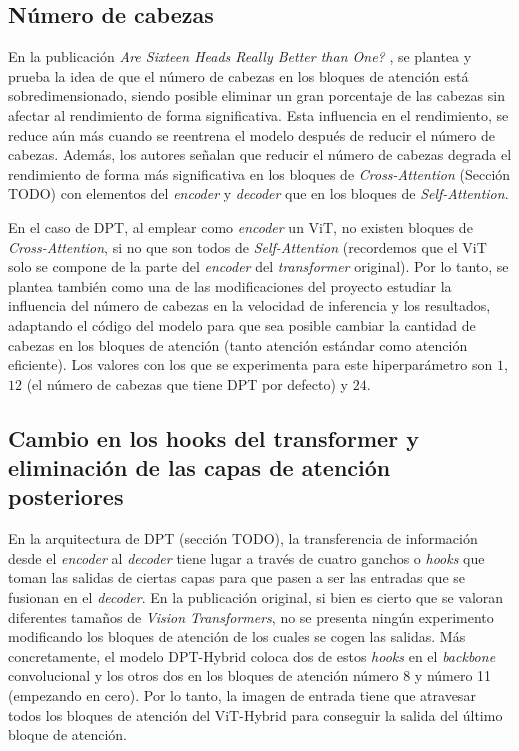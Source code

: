 \subsection{Número de cabezas}
En la publicación \textit{Are Sixteen Heads Really Better than One?} \cite{are16headsbetterthan1}, se plantea y prueba la idea de que el número de cabezas en los bloques de atención está sobredimensionado, siendo posible eliminar un gran porcentaje de las cabezas sin afectar al rendimiento de forma significativa. Esta influencia en el rendimiento, se reduce aún más cuando se reentrena el modelo después de reducir el número de cabezas.  Además, los autores señalan que reducir el número de cabezas degrada el rendimiento de forma más significativa en los bloques de \textit{Cross-Attention} (Sección TODO) con elementos del \textit{encoder} y \textit{decoder} que en los bloques de \textit{Self-Attention}. 

En el caso de DPT, al emplear como \textit{encoder} un ViT, no existen bloques de \textit{Cross-Attention}, si no que son todos de \textit{Self-Attention} (recordemos que el ViT solo se compone de la parte del \textit{encoder} del \textit{transformer} original). Por lo tanto, se plantea también como una de las modificaciones del proyecto estudiar la influencia del número de cabezas en la velocidad de inferencia y los resultados, adaptando el código del modelo para que sea posible cambiar la cantidad de cabezas en los bloques de atención (tanto atención estándar como atención eficiente). Los valores con los que se experimenta para este hiperparámetro son $1$, $12$ (el número de cabezas que tiene DPT por defecto) y $24$.

\subsection{Cambio en los hooks del transformer y eliminación de las capas de atención posteriores}

En la arquitectura de DPT (sección TODO), la transferencia de información desde el \textit{encoder} al \textit{decoder} tiene lugar a través de cuatro ganchos o \textit{hooks} que toman las salidas de ciertas capas para que pasen a ser las entradas que se fusionan en el \textit{decoder}. En la publicación original, si bien es cierto que se valoran diferentes tamaños de \textit{Vision Transformers}, no se presenta ningún experimento modificando los bloques de atención de los cuales se cogen las salidas. Más concretamente, el modelo DPT-Hybrid coloca dos de estos \textit{hooks} en el \textit{backbone} convolucional y los otros dos en los bloques de atención número 8 y número 11 (empezando en cero). Por lo tanto, la imagen de entrada tiene que atravesar todos los bloques de atención del ViT-Hybrid para conseguir la salida del último bloque de atención.


